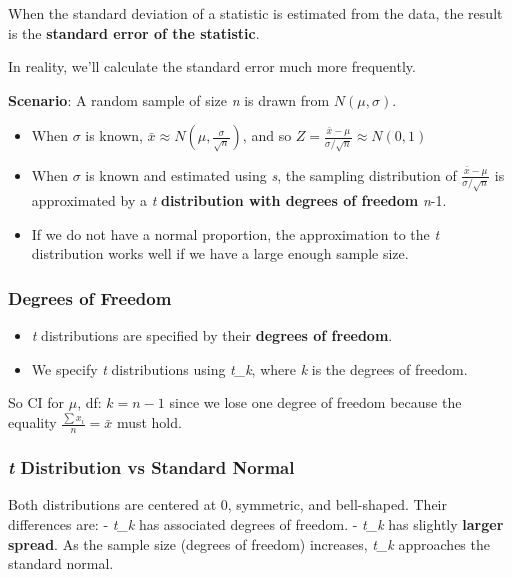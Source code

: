 \documentclass[
  openany]{book}
\providecommand{\tightlist}{%
  \setlength{\itemsep}{0pt}\setlength{\parskip}{0pt}}
\begin{document}
When the standard deviation of a statistic is estimated from the data, the result is the \textbf{standard error of the statistic}.

In reality, we'll calculate the standard error much more frequently.

\textbf{Scenario}: A random sample of size \emph{n} is drawn from \(N(\mu,\sigma)\).

\begin{itemize}
\tightlist
\item
  When \(\sigma\) is known, \(\bar{x}\approx N(\mu,\frac{\sigma}{\sqrt{n}})\), and so \(Z=\frac{\bar{x}-\mu}{\sigma/\sqrt{n}}\approx N(0,1)\)
\item
  When \(\sigma\) is known and estimated using \emph{s}, the sampling distribution of \(\frac{\bar{x}-\mu}{\sigma/\sqrt{n}}\) is approximated by a \emph{t} \textbf{distribution with degrees of freedom} \emph{n}-1.
\item
  If we do not have a normal proportion, the approximation to the \emph{t} distribution works well if we have a large enough sample size.
\end{itemize}

\subsubsection{Degrees of Freedom}\label{degrees-of-freedom}

\begin{itemize}
\tightlist
\item
  \emph{t} distributions are specified by their \textbf{degrees of freedom}.
\item
  We specify \emph{t} distributions using \emph{t\_k}, where \emph{k} is the degrees of freedom.
\end{itemize}

So CI for \(\mu\), df: \(k=n-1\) since we lose one degree of freedom because the equality \(\frac{\sum{x_i}}{n}=\bar{x}\) must hold.

\subsubsection{\texorpdfstring{\emph{t} Distribution vs Standard Normal}{t Distribution vs Standard Normal}}\label{t-distribution-vs-standard-normal}

Both distributions are centered at 0, symmetric, and bell-shaped. Their differences are: - \emph{t\_k} has associated degrees of freedom. - \emph{t\_k} has slightly \textbf{larger spread}. As the sample size (degrees of freedom) increases, \emph{t\_k} approaches the standard normal.
\end{document}
